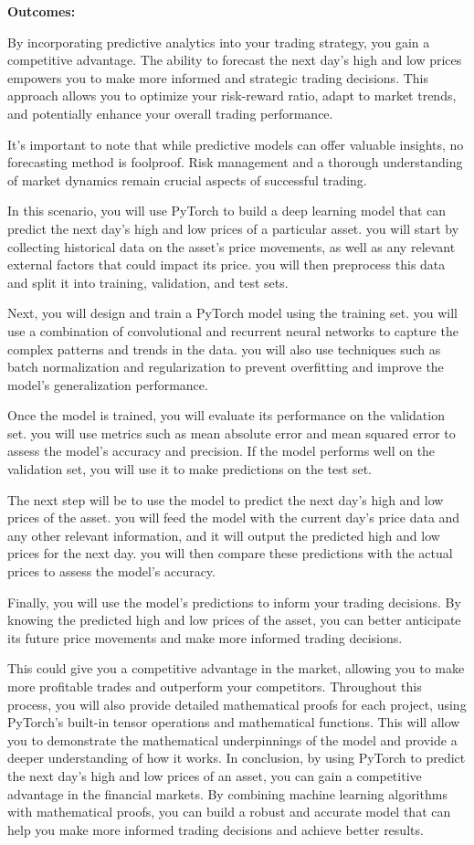 \documentclass[
  letterpaper,
  DIV=11,
  numbers=noendperiod]{scrreprt}
\begin{document}
\textbf{Outcomes:}

By incorporating predictive analytics into your trading strategy, you
gain a competitive advantage. The ability to forecast the next day's
high and low prices empowers you to make more informed and strategic
trading decisions. This approach allows you to optimize your risk-reward
ratio, adapt to market trends, and potentially enhance your overall
trading performance.

It's important to note that while predictive models can offer valuable
insights, no forecasting method is foolproof. Risk management and a
thorough understanding of market dynamics remain crucial aspects of
successful trading.

In this scenario, you will use PyTorch to build a deep learning model
that can predict the next day's high and low prices of a particular
asset. you will start by collecting historical data on the asset's price
movements, as well as any relevant external factors that could impact
its price. you will then preprocess this data and split it into
training, validation, and test sets.

Next, you will design and train a PyTorch model using the training set.
you will use a combination of convolutional and recurrent neural
networks to capture the complex patterns and trends in the data. you
will also use techniques such as batch normalization and regularization
to prevent overfitting and improve the model's generalization
performance.

Once the model is trained, you will evaluate its performance on the
validation set. you will use metrics such as mean absolute error and
mean squared error to assess the model's accuracy and precision. If the
model performs well on the validation set, you will use it to make
predictions on the test set.

The next step will be to use the model to predict the next day's high
and low prices of the asset. you will feed the model with the current
day's price data and any other relevant information, and it will output
the predicted high and low prices for the next day. you will then
compare these predictions with the actual prices to assess the model's
accuracy.

Finally, you will use the model's predictions to inform your trading
decisions. By knowing the predicted high and low prices of the asset,
you can better anticipate its future price movements and make more
informed trading decisions.

This could give you a competitive advantage in the market, allowing you
to make more profitable trades and outperform your competitors.
Throughout this process, you will also provide detailed mathematical
proofs for each project, using PyTorch's built-in tensor operations and
mathematical functions. This will allow you to demonstrate the
mathematical underpinnings of the model and provide a deeper
understanding of how it works. In conclusion, by using PyTorch to
predict the next day's high and low prices of an asset, you can gain a
competitive advantage in the financial markets. By combining machine
learning algorithms with mathematical proofs, you can build a robust and
accurate model that can help you make more informed trading decisions
and achieve better results.
\end{document}
